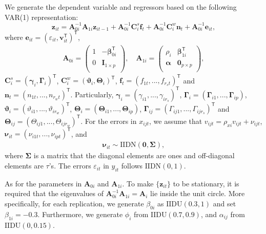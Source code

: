 \documentclass[11pt,a4paper]{article}
\newcommand{\veps}{\varepsilon}
\newcommand{\Balpha}{\boldsymbol{\alpha}}
\newcommand{\Bbeta}{\boldsymbol{\beta}}
\newcommand{\Bgamma}{\boldsymbol{\gamma}}
\newcommand{\Bvartheta}{\boldsymbol{\vartheta}}
\newcommand{\Bnu}{\boldsymbol{\nu}}
\newcommand{\BGamma}{\boldsymbol{\Gamma}}
\newcommand{\BTheta}{\boldsymbol{\Theta}}
\newcommand{\BSigma}{\boldsymbol{\Sigma}}
\newcommand{\MBzero}{\mathbf{0}}
\newcommand{\MBA}{\mathbf{A}}
\newcommand{\MBC}{\mathbf{C}}
\newcommand{\MBe}{\mathbf{e}}
\newcommand{\MBf}{\mathbf{f}}
\newcommand{\MBI}{\mathbf{I}}
\newcommand{\MBn}{\mathbf{n}}
\newcommand{\MBv}{\mathbf{v}}
\newcommand{\MBz}{\mathbf{z}}
\newcommand{\tp}{\mathsf{T}}
\theoremstyle{definition}
\begin{document}
We generate the dependent variable and regressors based on the following VAR(1) representation:
\[
\MBz_{it} =\MBA_{0i}^{-1}\MBA_{1i}\MBz_{it-1} +  \MBA_{0i}^{-1}\MBC_{i}^{s}\MBf_{t}+ \MBA_{0i}^{-1}\MBC_{i}^{w}\MBn_{t}+ \MBA_{0i}^{-1}\MBe_{it},
\]
where $\MBe_{it}=(\veps_{it}, \MBv_{it}^{\tp})^{\tp}$,
\begin{align*}
\MBA_{0i}= \left(\begin{array}{cc}
         1 & -\Bbeta_{0i}^{\tp} \\
                     0 & \MBI_{1\times p}  \\
                   \end{array}
                 \right),\quad \MBA_{1i}=\left(
        \begin{array}{cc}
          \rho_{i} & \Bbeta_{1i}^{\tp} \\
          \Balpha & \MBzero_{p\times p} \\
        \end{array}
      \right),
\end{align*}
$\MBC_{i}^{s}=(\Bgamma_{i},\BGamma_{i})^{\tp}$, $\MBC_{i}^{w}=(\Bvartheta_{i},\BTheta_{i})^{\tp}$, $\MBf_t=(f_{1 t},...,f_{r_s t})^{\tp}$  and $\MBn_t=(n_{1 t},...,n_{r_w t})^{\tp}$. Particularly, $\Bgamma_{i}=(\gamma_{i1},...,\gamma_{ir_s})^{\tp}$, $\BGamma_{i}=(\BGamma_{i1},...,\BGamma_{ip})$, $\Bvartheta_{i}=(\vartheta_{i1},...,\vartheta_{ir_w})^{\tp}$, $\BTheta_{i}=(\BTheta_{i1},...,\BTheta_{ip})$, $\BGamma_{ij}=(\Gamma_{ij1},...,\Gamma_{ijr_{s}})^{\tp}$ and $\BTheta_{ij}=(\Theta_{ij1},...,\Theta_{ijr_{w}})^{\tp}$.  For the errors in $x_{ijt}$, we assume that  $v_{ijt} =\rho_{xi}v_{ijt} +\nu_{ijt}$, $\Bnu_{it}=(\nu_{i1t},...,\nu_{ipt})^{\tp}$, and
\begin{align*}
\Bnu_{it}\sim \mathrm{IIDN} \left(\MBzero, \BSigma\right),
\end{align*}
where $\BSigma$ is a matrix that the diagonal elements are ones and off-diagonal elements are $\tau$'s. The errors $\veps_{it}$ in $y_{it}$ follows $\mathrm{IIDN} (0, 1)$.

As for the parameters in $\MBA_{0i}$ and $\MBA_{1i}$. To make $\{\MBz_{it}\}$ to be stationary, it is required that the eigenvalues of $\MBA_{0i}^{-1}\MBA_{1i}=\MBA_{i}$ lie inside the unit circle. More specifically, for each replication, we generate $\beta_{0i}$ as $\mathrm{IIDU}(0.3,1)$ and set
$\beta_{1i}=-0.3$. Furthermore, we generate $\phi_i$ from $\mathrm{IIDU}(0.7,0.9)$, and $\alpha_{ij}$ from $\mathrm{IIDU}(0,0.15)$.
\end{document}

